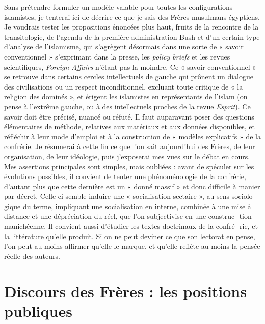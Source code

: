 Sans prétendre formuler un modèle valable pour toutes les configurations
islamistes, je tenterai ici de décrire ce que je sais des Frères
musulmans égyptiens. Je voudrais tester les propositions énoncées plus
haut, fruits de la rencontre de la transitologie, de l'agenda de la
première administration Bush et d'un certain type d'analyse de
l'islamisme, qui s'agrègent désormais dans une sorte de « savoir
conventionnel » s'exprimant dans la presse, les \emph{policy briefs} et
les revues scientifiques, \emph{Foreign Affairs} n'étant pas la moindre.
Ce « savoir conventionnel » se retrouve dans certains cercles
intellectuels de gauche qui prônent un dialogue des civilisations ou un
respect inconditionnel, excluant toute critique de « la religion des
dominés », et érigent les islamistes en représentants de l'islam (on
pense à l'extrême gauche, ou à des intellectuels proches de la revue
\emph{Esprit}). Ce savoir doit être précisé, nuancé ou réfuté. Il faut
auparavant poser des questions élémentaires de méthode, relatives aux
matériaux et aux données disponibles, et réfléchir à leur mode d'emploi
et à la construction de « modèles explicatifs » de la confrérie. Je
résumerai à cette fin ce que l'on sait aujourd'hui des Frères, de leur
organisation, de leur idéologie, puis j'exposerai mes vues sur le débat
en cours. Mes assertions principales sont simples, mais oubliées : avant
de spéculer sur les évolutions possibles, il convient de tenter une
phénoménologie de la confrérie, d'autant plus que cette dernière est un
« donné massif » et donc difficile à manier par décret. Celle-ci semble
induire une « socialisation sectaire », au sens sociolo- gique du terme,
impliquant une socialisation en interne, combinée à une mise à distance
et une dépréciation du réel, que l'on subjectivise en une construc- tion
manichéenne. Il convient aussi d'étudier les textes doctrinaux de la
confré- rie, et la littérature qu'elle produit. Si on ne peut deviner ce
que son lectorat en pense, l'on peut au moins affirmer qu'elle le
marque, et qu'elle reflète au moins la pensée réelle des auteurs.
 

\hypertarget{discours-des-fruxe8res-les-positions-publiques}{%
\section{Discours des Frères : les positions
publiques}\label{discours-des-fruxe8res-les-positions-publiques}}

